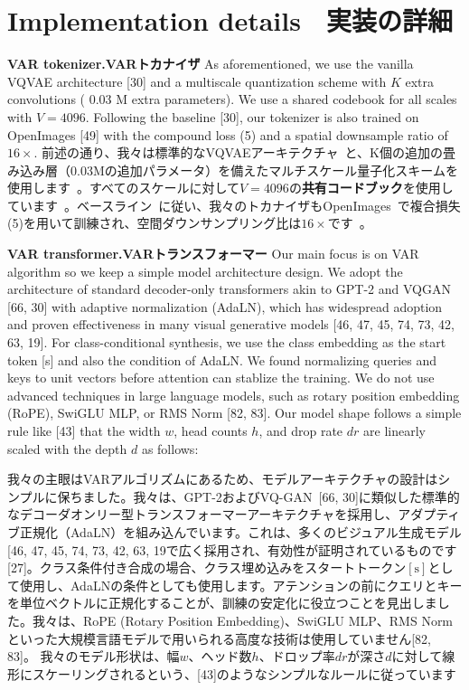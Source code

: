 \documentclass{article}
\begin{document}
\section*{Implementation details　実装の詳細}

\textbf{VAR tokenizer.VARトカナイザ}
As aforementioned, we use the vanilla VQVAE architecture [30] and a multiscale quantization scheme with $K$ extra convolutions ( 0.03 M extra parameters). We use a shared codebook for all scales with $V=4096$. Following the baseline [30], our tokenizer is also trained on OpenImages [49] with the compound loss (5) and a spatial downsample ratio of $16 \times$.
前述の通り、我々は標準的なVQVAEアーキテクチャ~\cite{30}と、K個の追加の畳み込み層（0.03Mの追加パラメータ）を備えたマルチスケール量子化スキームを使用します~\cite{26, 27}。すべてのスケールに対して$V=4096$の\textbf{共有コードブック}を使用しています~\cite{26}。ベースライン~\cite{30}に従い、我々のトカナイザもOpenImages~\cite{49}で複合損失(5)を用いて訓練され、空間ダウンサンプリング比は$16\times$です~\cite{26}。

\textbf{VAR transformer.VARトランスフォーマー} Our main focus is on VAR algorithm so we keep a simple model architecture design. We adopt the architecture of standard decoder-only transformers akin to GPT-2 and VQGAN [66, 30] with adaptive normalization (AdaLN), which has widespread adoption and proven effectiveness in many visual generative models [46, 47, 45, 74, 73, 42, 63, 19]. For class-conditional synthesis, we use the class embedding as the start token [s] and also the condition of AdaLN. We found normalizing queries and keys to unit vectors before attention can stablize the training. We do not use advanced techniques in large language models, such as rotary position embedding (RoPE), SwiGLU MLP, or RMS Norm [82, 83]. Our model shape follows a simple rule like [43] that the width $w$, head counts $h$, and drop rate $d r$ are linearly scaled with the depth $d$ as follows:

我々の主眼はVARアルゴリズムにあるため、モデルアーキテクチャの設計はシンプルに保ちました。我々は、GPT-2およびVQ-GAN~[66, 30]に類似した標準的なデコーダオンリー型トランスフォーマーアーキテクチャを採用し、アダプティブ正規化（AdaLN）を組み込んでいます。これは、多くのビジュアル生成モデル[46, 47, 45, 74, 73, 42, 63, 19で広く採用され、有効性が証明されているものです[27]。クラス条件付き合成の場合、クラス埋め込みをスタートトークン$[\text{s}]$として使用し、AdaLNの条件としても使用します。アテンションの前にクエリとキーを単位ベクトルに正規化することが、訓練の安定化に役立つことを見出しました。我々は、RoPE (Rotary Position Embedding)、SwiGLU MLP、RMS Normといった大規模言語モデルで用いられる高度な技術は使用していません[82, 83]。
我々のモデル形状は、幅$w$、ヘッド数$h$、ドロップ率$dr$が深さ$d$に対して線形にスケーリングされるという、[43]のようなシンプルなルールに従っています
\end{document}
